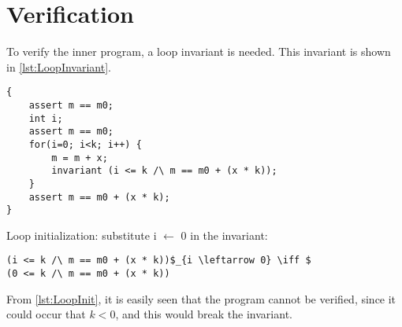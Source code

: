 \documentclass[Main_Assignment4]{subfiles}
\begin{document}
\section{Verification}
To verify the inner program, a loop invariant is needed. 
This invariant is shown in \codeTitle \ref{lst:LoopInvariant}. 

\begin{lstlisting}[caption=Loop invariant, style=Code-C++, label=lst:LoopInvariant]
{
	assert m == m0;
	int i;
	assert m == m0;
	for(i=0; i<k; i++) {
		m = m + x;
		invariant (i <= k /\ m == m0 + (x * k));
	}
	assert m == m0 + (x * k);
}
\end{lstlisting}


Loop initialization: substitute i $\leftarrow$ 0 in the invariant:
\begin{lstlisting}[caption=Loop initialization, style=Code-C++, label=lst:LoopInit]
(i <= k /\ m == m0 + (x * k))$_{i \leftarrow 0} \iff $ 
(0 <= k /\ m == m0 + (x * k))  
\end{lstlisting}

From \codeTitle \ref{lst:LoopInit}, it is easily seen that the program cannot be verified, since it could occur that $k < 0$, and this would break the invariant.
\end{document}
